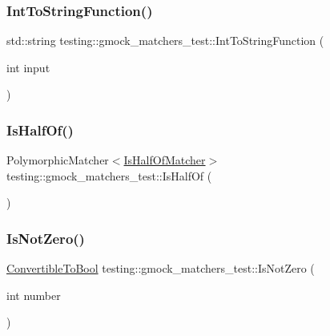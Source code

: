 \subsubsection{\texorpdfstring{IntToStringFunction()}{IntToStringFunction()}}
{\footnotesize\ttfamily std\+::string testing\+::gmock\+\_\+matchers\+\_\+test\+::\+Int\+To\+String\+Function (\begin{DoxyParamCaption}\item[{int}]{input }\end{DoxyParamCaption})}

\mbox{\label{namespacetesting_1_1gmock__matchers__test_ace0a8f64b108c7a9c32c2cac15185461}} 
\subsubsection{\texorpdfstring{IsHalfOf()}{IsHalfOf()}}
{\footnotesize\ttfamily Polymorphic\+Matcher$<$\mbox{\hyperlink{classtesting_1_1gmock__matchers__test_1_1IsHalfOfMatcher}{Is\+Half\+Of\+Matcher}}$>$ testing\+::gmock\+\_\+matchers\+\_\+test\+::\+Is\+Half\+Of (\begin{DoxyParamCaption}{ }\end{DoxyParamCaption})}

\mbox{\label{namespacetesting_1_1gmock__matchers__test_a248045bc57c8bad87b7d185b5c292f60}} 
\subsubsection{\texorpdfstring{IsNotZero()}{IsNotZero()}}
{\footnotesize\ttfamily \mbox{\hyperlink{classtesting_1_1gmock__matchers__test_1_1ConvertibleToBool}{Convertible\+To\+Bool}} testing\+::gmock\+\_\+matchers\+\_\+test\+::\+Is\+Not\+Zero (\begin{DoxyParamCaption}\item[{int}]{number }\end{DoxyParamCaption})}

\mbox{\label{namespacetesting_1_1gmock__matchers__test_a70e728cf67d0224c3ebb9eb8959cc39d}} 

